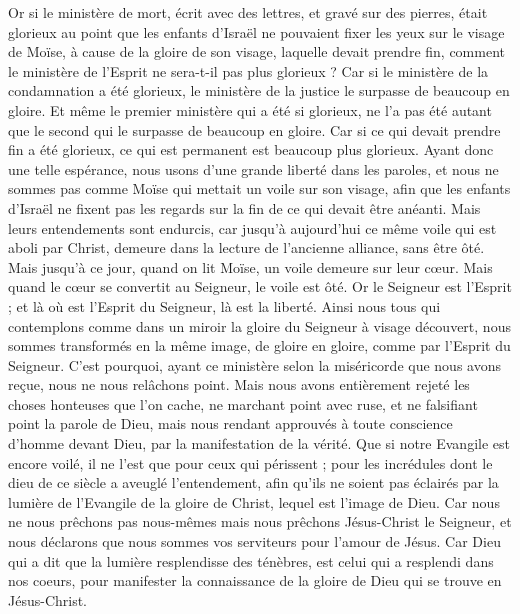 \begin{multicols}{2}
Or si le ministère de mort, écrit avec des lettres, et gravé sur des pierres, était glorieux au point que les enfants d'Israël ne pouvaient fixer les yeux sur le visage de Moïse, à cause de la gloire de son visage, laquelle devait prendre fin,
comment le ministère de l'Esprit ne sera-t-il pas plus glorieux ?
Car si le ministère de la condamnation a été glorieux, le ministère de la justice le surpasse de beaucoup en gloire.
Et même le premier ministère qui a été si glorieux, ne l'a pas été autant que le second qui le surpasse de beaucoup en gloire.
Car si ce qui devait prendre fin a été glorieux, ce qui est permanent est beaucoup plus glorieux.
Ayant donc une telle espérance, nous usons d'une grande liberté dans les paroles,
et nous ne sommes pas comme Moïse qui mettait un voile sur son visage, afin que les enfants d'Israël ne fixent pas les regards sur la fin de ce qui devait être anéanti.
Mais leurs entendements sont endurcis, car jusqu'à aujourd'hui ce même voile qui est aboli par Christ, demeure dans la lecture de l'ancienne alliance, sans être ôté.
Mais jusqu'à ce jour, quand on lit Moïse, un voile demeure sur leur cœur.
Mais quand le cœur se convertit au Seigneur, le voile est ôté.
Or le Seigneur est l'Esprit ; et là où est l'Esprit du Seigneur, là est la liberté.
Ainsi nous tous qui contemplons comme dans un miroir la gloire du Seigneur à visage découvert, nous sommes transformés en la même image, de gloire en gloire, comme par l'Esprit du Seigneur.
\VerseOne{}C'est pourquoi, ayant ce ministère selon la miséricorde que nous avons reçue, nous ne nous relâchons point.
Mais nous avons entièrement rejeté les choses honteuses que l'on cache, ne marchant point avec ruse, et ne falsifiant point la parole de Dieu, mais nous rendant approuvés à toute conscience d'homme devant Dieu, par la manifestation de la vérité.
Que si notre Evangile est encore voilé, il ne l'est que pour ceux qui périssent ;
pour les incrédules dont le dieu de ce siècle a aveuglé l’entendement, afin qu’ils ne soient pas éclairés par la lumière de l'Evangile de la gloire de Christ, lequel est l'image de Dieu.
Car nous ne nous prêchons pas nous-mêmes mais nous prêchons Jésus-Christ le Seigneur, et nous déclarons que nous sommes vos serviteurs pour l'amour de Jésus.
Car Dieu qui a dit que la lumière resplendisse des ténèbres, est celui qui a resplendi dans nos coeurs, pour manifester la connaissance de la gloire de Dieu qui se trouve en Jésus-Christ.

\end{multicols}
